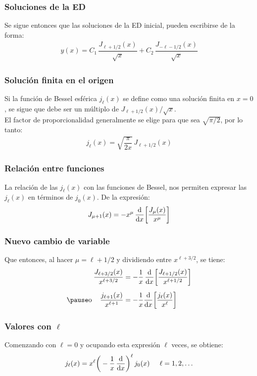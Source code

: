 \documentclass[12pt]{beamer}
\begin{document}
\begin{frame}
\frametitle{Soluciones de la ED}
Se sigue entonces que las soluciones de la ED inicial, pueden escribirse de la forma:
\pause
\begin{align*}
y (x) = C_{1} \, \dfrac{J_{\ell+1/2} (x)}{\sqrt{x}} + C_{2} \, \dfrac{J_{-\ell-1/2} (x)}{\sqrt{x}}
\end{align*}
\end{frame}
\begin{frame}
\frametitle{Solución finita en el origen}
Si la función de Bessel esférica $j_{\ell} (x)$ se define como una solución finita en $x = 0$, \pause se sigue que debe ser un múltiplo de $J_{\ell+1/2} (x) / \sqrt{x}$.
\\
\bigskip
\pause
El factor de proporcionalidad generalmente se elige para que sea $\sqrt{\pi/2}$, por lo tanto:
\pause
\begin{align*}
j_{\ell} (x) = \sqrt{\dfrac{\pi}{2 x}} \, J_{\ell+1/2} (x)
\end{align*}
\end{frame}
\begin{frame}
\frametitle{Relación entre funciones}
La relación de las $j_{\ell} (x)$ con las funciones de Bessel, nos permiten expresar las $j_{\ell} (x)$ en términos de $j_{0} (x)$. \pause De la expresión:
\pause
\begin{align*}
J_{\mu+1} (x) = - x^{\mu} \, \dv{x} \bigg[ \dfrac{J_{\mu} (x)}{x^{\mu}} \bigg]
\end{align*}
\end{frame}
\begin{frame}
\frametitle{Nuevo cambio de variable}
Que entonces, al hacer $\mu = \ell + 1/2$ y dividiendo entre $x^{\ell+3/2}$, se tiene:
\pause
\begin{eqnarray*}
\begin{aligned}
\dfrac{J_{\ell+3/2} (x)}{x^{\ell+3/2}} &= - \dfrac{1}{x} \, \dv{x} \bigg[ \dfrac{J_{\ell+1/2} (x)}{x^{\ell+1/2}} \bigg] \\[0.5em] \pause
\mbox{o } \hspace{0.3cm} \dfrac{j_{\ell+1} (x)}{x^{\ell+1}} &= - \dfrac{1}{x} \dv{x} \bigg[ \dfrac{j_{\ell} (x)}{x^{\ell}} \bigg]
\end{aligned}
\end{eqnarray*}
\end{frame}
\begin{frame}
\frametitle{Valores con $\ell$}
Comenzando con $\ell = 0$ y ocupando esta expresión $\ell$ veces, se obtiene:
\pause
\begin{align*}
j_{\ell} (x) = x^{\ell} \bigg( - \dfrac{1}{x} \, \dv{x} \bigg)^{\ell} \, j_{0} (x) \hspace{0.5cm} \ell = 1, 2, \ldots 
\end{align*}
\end{frame}
\end{document}
